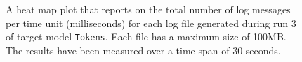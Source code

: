 \begin{figure}[htbp]
\centering
\begin{minipage}{1\textwidth}
  \centering
\end{minipage}
\caption{A heat map plot that reports on the total number of log messages per time unit (milliseconds) for each log file generated during run 3 of target model \texttt{Tokens}. Each file has a maximum size of 100MB. The results have been measured over a time span of 30 seconds.}
\label{figure:throughput_sum_tokens_3}
\end{figure}